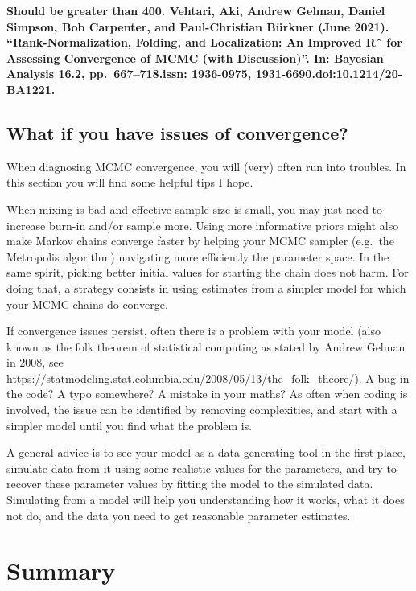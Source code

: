 \documentclass[
  12pt,
]{krantz}
\begin{document}
\textbf{Should be greater than 400. Vehtari, Aki, Andrew Gelman, Daniel Simpson, Bob Carpenter, and Paul-Christian Bürkner (June 2021). ``Rank-Normalization, Folding, and Localization: An Improved Rˆ for Assessing Convergence of MCMC (with Discussion)''. In: Bayesian Analysis 16.2, pp.~667--718.issn: 1936-0975, 1931-6690.doi:10.1214/20-BA1221.}

\subsection{What if you have issues of convergence?}\label{what-if-you-have-issues-of-convergence}

When diagnosing MCMC convergence, you will (very) often run into troubles. In this section you will find some helpful tips I hope.

When mixing is bad and effective sample size is small, you may just need to increase burn-in and/or sample more. Using more informative priors might also make Markov chains converge faster by helping your MCMC sampler (e.g.~the Metropolis algorithm) navigating more efficiently the parameter space. In the same spirit, picking better initial values for starting the chain does not harm. For doing that, a strategy consists in using estimates from a simpler model for which your MCMC chains do converge.

If convergence issues persist, often there is a problem with your model (also known as the folk theorem of statistical computing as stated by Andrew Gelman in 2008, see \url{https://statmodeling.stat.columbia.edu/2008/05/13/the_folk_theore/}). A bug in the code? A typo somewhere? A mistake in your maths? As often when coding is involved, the issue can be identified by removing complexities, and start with a simpler model until you find what the problem is.

A general advice is to see your model as a data generating tool in the first place, simulate data from it using some realistic values for the parameters, and try to recover these parameter values by fitting the model to the simulated data. Simulating from a model will help you understanding how it works, what it does not do, and the data you need to get reasonable parameter estimates.

\section{Summary}\label{summary}
\end{document}
